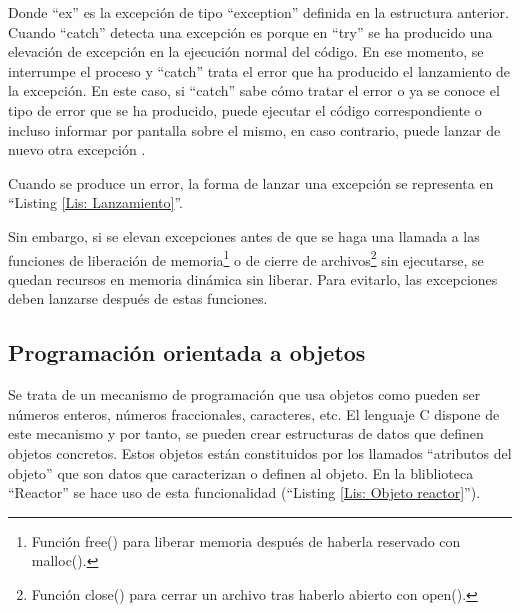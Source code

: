 Donde ``ex'' es la excepción de tipo ``exception'' definida en la estructura anterior. Cuando ``catch'' detecta una excepción es porque en ``try'' se ha producido una elevación de excepción en la ejecución normal del código. En ese momento, se interrumpe el proceso y ``catch'' trata el error que ha producido el lanzamiento de la excepción. En este caso, si ``catch'' sabe cómo tratar el error o ya se conoce el tipo de error que se ha producido, puede ejecutar el código correspondiente o incluso informar por pantalla sobre el mismo, en caso contrario, puede lanzar de nuevo otra excepción \citep[pág. 87--89]{tallerRPi}.

Cuando se produce un error, la forma de lanzar una excepción se representa en ``Listing \ref{Lis: Lanzamiento}''.


Sin embargo, si se elevan excepciones antes de que se haga una llamada a las funciones de liberación de memoria\footnote{Función free() para liberar memoria después de haberla reservado con malloc().} o de cierre de archivos\footnote{Función close() para cerrar un archivo tras haberlo abierto con open().} sin ejecutarse, se quedan recursos en memoria dinámica sin liberar. Para evitarlo, las excepciones deben lanzarse después de estas funciones.

\subsection{Programación orientada a objetos} \label{s2_1_5}

Se trata de un mecanismo de programación que usa objetos como pueden ser números enteros, números fraccionales, caracteres, etc. El lenguaje C dispone de este mecanismo y por tanto, se pueden crear estructuras de datos que definen objetos concretos. Estos objetos están constituidos por los llamados ``atributos del objeto'' que son datos que caracterizan o definen al objeto. En la bliblioteca ``Reactor'' se hace uso de esta funcionalidad (``Listing \ref{Lis: Objeto reactor}'').

